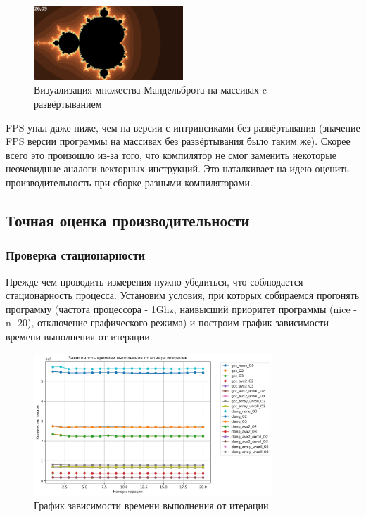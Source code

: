 \documentclass[12pt,a4paper]{article}
\begin{document}
\begin{figure}[ht!]
    \centering
    \includegraphics[width=0.5\textwidth]{mand_arr.png}
    \caption{Визуализация множества Мандельброта на массивах c развёртыванием}
    \label{fig:mand_arr2}
\end{figure}

FPS упал даже ниже, чем на версии с интринсиками без развёртывания (значение FPS версии программы на массивах без развёртывания было таким же). Скорее всего это произошло из-за того, что компилятор не смог заменить некоторые неочевидные аналоги векторных инструкций. Это наталкивает на идею оценить производительность при сборке разными компиляторами.

\subsection{Точная оценка производительности}

\subsubsection{Проверка стационарности}

Прежде чем проводить измерения нужно убедиться, что соблюдается стационарность процесса. Установим условия, при которых собираемся прогонять программу (частота процессора - 1Ghz, наивысший приоритет программы (nice -n -20), отключение графического режима) и построим график зависимости времени выполнения от итерации.

\begin{figure}[ht!]
    \centering
    \includegraphics[width=0.8\textwidth]{stat_check.png}
    \caption{График зависимости времени выполнения от итерации}
    \label{fig:stat_check}
\end{figure}
\end{document}
